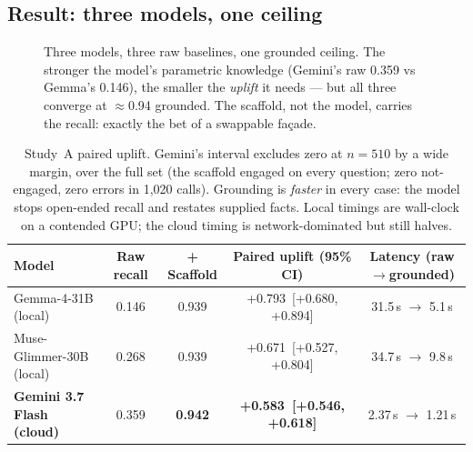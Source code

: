 \documentclass[11pt]{article}
\newcommand{\up}[1]{\textcolor{burnt}{+#1}}
\begin{document}
\subsection{Result: three models, one ceiling}
\begin{figure}[H]\centering
{}
\caption{Three models, three raw baselines, one grounded ceiling. The stronger the model's
parametric knowledge (Gemini's raw 0.359 vs Gemma's 0.146), the smaller the \emph{uplift} it
needs --- but all three converge at $\approx$0.94 grounded. The scaffold, not the model, carries
the recall: exactly the bet of a swappable façade.}
\end{figure}

\begin{samepage}
\begin{table}[h]\centering\small
\begin{tabular}{lcccc}
\toprule
Model & Raw recall & + Scaffold & Paired uplift (95\% CI) & Latency (raw$\to$grounded) \\
\midrule
Gemma-4-31B (local) & 0.146 & 0.939 & \up{0.793}\ [+0.680, +0.894] & 31.5\,s $\to$ 5.1\,s \\
Muse-Glimmer-30B (local) & 0.268 & 0.939 & \up{0.671}\ [+0.527, +0.804] & 34.7\,s $\to$ 9.8\,s \\
\textbf{Gemini 3.7 Flash (cloud)} & 0.359 & \textbf{0.942} & \textbf{\up{0.583}\ [+0.546, +0.618]} & 2.37\,s $\to$ 1.21\,s \\
\bottomrule
\end{tabular}
\caption{Study~A paired uplift. Gemini's interval excludes zero at $n=510$ by a wide margin, over
the full set (the scaffold engaged on every question; zero not-engaged, zero errors in 1{,}020
calls). Grounding is \emph{faster} in every case: the model stops open-ended recall and restates
supplied facts. Local timings are wall-clock on a contended GPU; the cloud timing is
network-dominated but still halves.}
\end{table}
\end{samepage}
\end{document}
